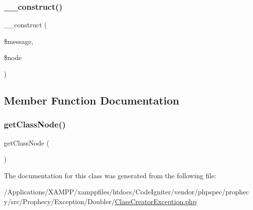 \subsubsection{\texorpdfstring{\+\_\+\+\_\+construct()}{\_\_construct()}}
{\footnotesize\ttfamily \+\_\+\+\_\+construct (\begin{DoxyParamCaption}\item[{}]{\$message,  }\item[{\mbox{\hyperlink{class_prophecy_1_1_doubler_1_1_generator_1_1_node_1_1_class_node}{Class\+Node}}}]{\$node }\end{DoxyParamCaption})}



\subsection{Member Function Documentation}
\mbox{\label{class_prophecy_1_1_exception_1_1_doubler_1_1_class_creator_exception_ae536f49063b0573c82912fc61dff7c5a}} 
\subsubsection{\texorpdfstring{get\+Class\+Node()}{getClassNode()}}
{\footnotesize\ttfamily get\+Class\+Node (\begin{DoxyParamCaption}{ }\end{DoxyParamCaption})}



The documentation for this class was generated from the following file\+:\begin{DoxyCompactItemize}
\item 
/\+Applications/\+X\+A\+M\+P\+P/xamppfiles/htdocs/\+Code\+Igniter/vendor/phpspec/prophecy/src/\+Prophecy/\+Exception/\+Doubler/\mbox{\hyperlink{_class_creator_exception_8php}{Class\+Creator\+Exception.\+php}}\end{DoxyCompactItemize}
